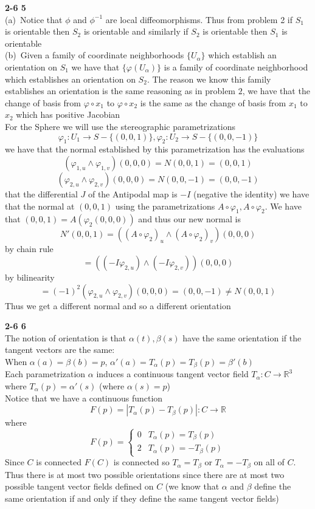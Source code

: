 \documentclass[12pt]{article}
\newenvironment{ques}[1]{\textbf{#1}\vspace{1 mm}\\ }{\bigskip}
\theoremstyle{definition}
\newcommand{\R}{\mathbb R}
\renewcommand{\a}{\alpha}
\renewcommand{\b}{\beta}
\begin{document}
\begin{ques}{2-6 5}
	(a)\ Notice that $\phi$ and $\phi^{-1}$ are local diffeomorphisms. Thus
	from problem 2 if $S_1$ is orientable then $S_2$ is orientable and
	similarly if $S_2$ is orientable then $S_1$ is orientable\\
	(b)\ Given a family of coordinate neighborhoods $\{U_\a\}$ which establish
	an orientation on $S_1$ we have that $\{\varphi (U_\a)\}$ is a family of
	coordinate neighborhood which establishes an orientation on $S_2$. The
	reason we know this family establishes an orientation is the same reasoning
	as in problem $2$, we have that the change of basis from $\varphi \circ
	x_1$ to $\varphi \circ x_2$ is the same as the change of basis from $x_1$
	to $x_2$ which has positive Jacobian\\
	For the Sphere we will use the stereographic parametrizations
	$$\varphi_1:U_1 \to S - \{(0,0,1)\}, \varphi_2:U_2 \to S - \{(0,0,-1)\}$$
	we have that the normal established by this
	parametrization has the evaluations 
	$$(\varphi_{1,u} \wedge \varphi_{1,v}) (0,0,0) = N(0,0,1) = (0,0,1)$$
	$$(\varphi_{2,u} \wedge \varphi_{2,v}) (0,0,0) =N(0,0,-1) = (0,0,-1)$$
	that the differential $J$ of the Antipodal map is $-I$ (negative the identity)
	we have that the normal at $(0,0,1)$ using the parametrizations
	$A \circ \varphi_1, A \circ \varphi_2$. We have that $(0,0,1) =
	A(\varphi_2(0,0,0))$ and thus our new normal is
	$$N'(0,0,1) = ((A \circ \varphi_2)_u \wedge (A \circ \varphi_2)_v)(0,0,0)$$
	by chain rule
	$$= ((-I  \varphi_{2,u}) \wedge (-I \varphi_{2,v}))(0,0,0)$$
	by bilinearity
	$$ = (-1)^2(\varphi_{2,u} \wedge \varphi_{2,v})(0,0,0) = (0,0,-1) \neq N(0,0,1)$$
	Thus we get a different normal and so a different orientation
\end{ques}

\begin{ques}{2-6 6}
	The notion of orientation is that $\a(t), \b(s)$ have the same
	orientation if the tangent vectors are the same:\\
	When $\a(a) = \b(b) = p$, $\a'(a)= T_\a(p) = T_\b(p) = \b'(b)$\\
	Each parametrization $\a$ induces a continuous tangent vector field $T_\a:C \to \R^3$
	where $T_\a(p) = \a'(s)$ (where $\a(s) = p$)\\
	Notice that we have a continuous function
	$$F(p) = |T_\a(p) - T_\b(p)|:C \to \R$$
	where
	$$F(p) = 
	\begin{cases}
	0 & T_\a(p) = T_\b(p)\\
	2 & T_\a(p) = -T_\b(p)
	\end{cases}$$
	Since $C$ is connected $F(C)$ is connected so $T_\a = T_\b$ or $T_\a =
	-T_\b$ on all of $C$. \\
	Thus there is at most two possible
	orientations since there are at most two possible tangent vector fields
	defined on $C$ (we know that $\a$ and $\b$ define the same orientation
	if and only if they define the same tangent vector fields)

\end{ques}
\end{document}
